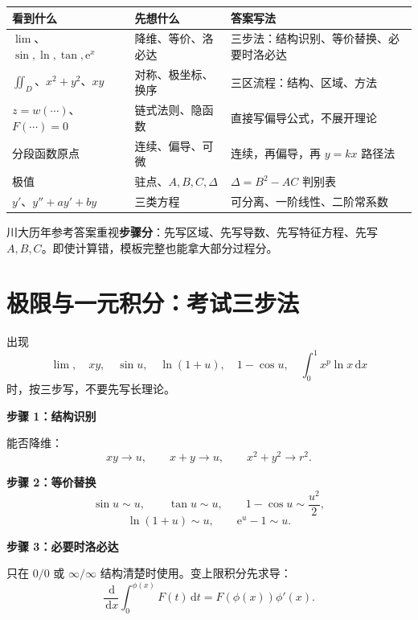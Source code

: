 \documentclass[11pt,a4paper,UTF8]{ctexart}
\newcommand{\dd}{\,\mathrm d}
\newcommand{\ee}{\mathrm e}
\begin{document}
\begin{center}
\renewcommand{\arraystretch}{1.28}
\begin{tabular}{p{3cm}p{6.3cm}p{5.4cm}}
\toprule
\textbf{看到什么} & \textbf{先想什么} & \textbf{答案写法}\\
\midrule
\(\lim\)、\(\sin,\ln,\tan,\ee^x\) & 降维、等价、洛必达 & 三步法：结构识别、等价替换、必要时洛必达\\
\(\iint_D\)、\(x^2+y^2\)、\(xy\) & 对称、极坐标、换序 & 三区流程：结构、区域、方法\\
\(z=w(\cdots)\)、\(F(\cdots)=0\) & 链式法则、隐函数 & 直接写偏导公式，不展开理论\\
分段函数原点 & 连续、偏导、可微 & 连续，再偏导，再 \(y=kx\) 路径法\\
极值 & 驻点、\(A,B,C,\Delta\) & \(\Delta=B^2-AC\) 判别表\\
\(y'\)、\(y''+ay'+by\) & 三类方程 & 可分离、一阶线性、二阶常系数\\
\bottomrule
\end{tabular}
\end{center}

\begin{scorebox}[阅卷习惯]
川大历年参考答案重视\textbf{步骤分}：先写区域、先写导数、先写特征方程、先写 \(A,B,C\)。即使计算错，模板完整也能拿大部分过程分。
\end{scorebox}

\newpage
\section{极限与一元积分：考试三步法}

\begin{identifybox}[识别]
出现
\[
\lim,\quad xy,\quad \sin u,\quad \ln(1+u),\quad 1-\cos u,\quad \int_0^1x^p\ln x\dd x
\]
时，按三步写，不要先写长理论。
\end{identifybox}

\begin{templatebox}[标准三步法]
\textbf{步骤 1：结构识别}

能否降维：
\[
xy\to u,\qquad x+y\to u,\qquad x^2+y^2\to r^2.
\]

\textbf{步骤 2：等价替换}
\[
\sin u\sim u,\qquad \tan u\sim u,\qquad 1-\cos u\sim\frac{u^2}{2},
\]
\[
\ln(1+u)\sim u,\qquad \ee^u-1\sim u.
\]

\textbf{步骤 3：必要时洛必达}

只在 \(0/0\) 或 \(\infty/\infty\) 结构清楚时使用。变上限积分先求导：
\[
\frac{\dd}{\dd x}\int_0^{\phi(x)}F(t)\dd t=F(\phi(x))\phi'(x).
\]
\end{templatebox}
\end{document}
